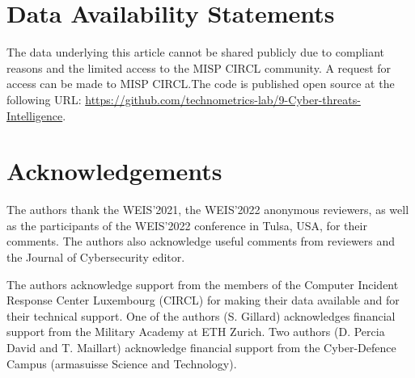 \documentclass[unnumsec,webpdf,contemporary,large]{oup-authoring-template}%
\theoremstyle{thmstyleone}%
\theoremstyle{thmstyletwo}%
\theoremstyle{thmstylethree}%
\begin{document}
\section*{Data Availability Statements}
The data underlying this article cannot be shared publicly due to compliant reasons and the limited access to the MISP CIRCL community. A request for access can be made to MISP CIRCL.The code is published open source at the following URL: \url{https://github.com/technometrics-lab/9-Cyber-threats-Intelligence}.


\section*{Acknowledgements}
The authors thank the WEIS’2021, the WEIS’2022  anonymous reviewers, as well as the participants of the WEIS'2022 conference in Tulsa, USA, for their comments. The authors also acknowledge useful comments from reviewers and the Journal of Cybersecurity editor.

The authors acknowledge support from the members of the Computer Incident Response Center Luxembourg (CIRCL) for making their data available and for their technical support. One of the authors (S. Gillard) acknowledges financial support from the Military Academy at ETH Zurich. Two authors (D. Percia David and T. Maillart) acknowledge financial support from the Cyber-Defence Campus (armasuisse Science and Technology).



%
\end{document}
